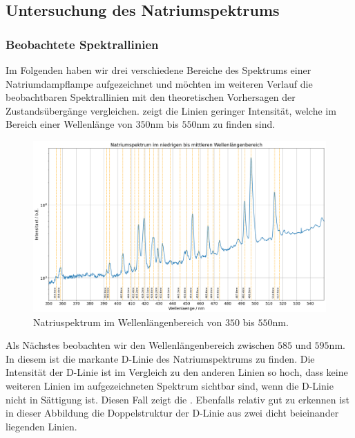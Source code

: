 \subsection{Untersuchung des Natriumspektrums}

\subsubsection*{Beobachtete Spektrallinien}

Im Folgenden haben wir drei verschiedene Bereiche des Spektrums einer Natriumdampflampe aufgezeichnet und möchten im weiteren Verlauf die beobachtbaren Spektrallinien mit den theoretischen Vorhersagen der Zustandsübergänge vergleichen.  zeigt die Linien geringer Intensität, welche im Bereich einer Wellenlänge von $350\si{\nano\meter}$ bis $550\si{\nano\meter}$ zu finden sind. 


\begin{figure}[H]
  \centering
  \includegraphics[width=.9\textwidth]{files/plots/na_spek_350_550.png}
  \caption{Natriuspektrum im Wellenlängenbereich von $350$ bis $550\si{\nano\meter}$.}
  \label{fig:na_spek_350_550}
\end{figure}

Als Nächstes beobachten wir den Wellenlängenbereich zwischen $585$ und $595\si{\nano\meter}$. In diesem ist die markante D-Linie des Natriumspektrums zu finden. Die Intensität der D-Linie ist im Vergleich zu den anderen Linien so hoch, dass keine weiteren Linien im aufgezeichneten Spektrum sichtbar sind, wenn die D-Linie nicht in Sättigung ist. Diesen Fall zeigt die . Ebenfalls relativ gut zu erkennen ist in dieser Abbildung die Doppelstruktur der D-Linie aus zwei dicht beieinander liegenden Linien.


